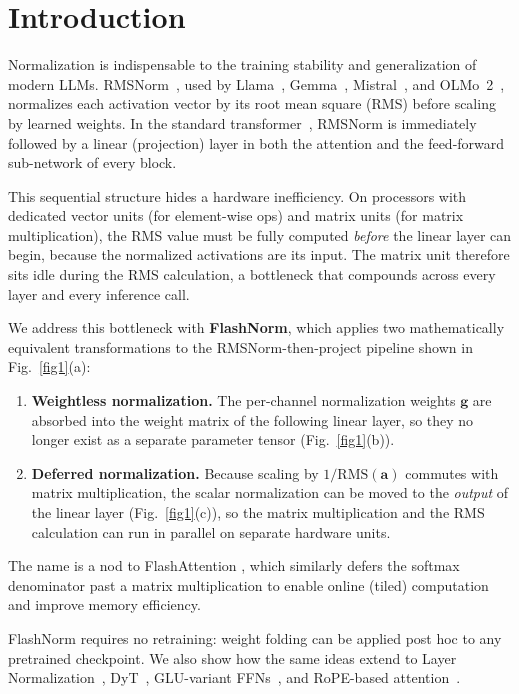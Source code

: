 \documentclass{article}
\begin{document}
\section{Introduction}
Normalization is indispensable to the training stability and generalization of
modern LLMs. RMSNorm~\citep{rms}, used by Llama~\citep{LLaMA},
Gemma~\citep{gemma}, Mistral~\citep{mistral}, and
OLMo~2~\citep{olmo2}, normalizes each activation vector by its root mean
square (RMS) before scaling by learned weights. In the standard transformer~\citep{vanilla},
RMSNorm is immediately followed by a linear (projection) layer in both the attention and the
feed-forward sub-network of every block.

This sequential structure hides a hardware inefficiency. On processors with
dedicated vector units (for element-wise ops) and matrix units (for matrix multiplication), the
RMS value must be fully computed \emph{before} the linear layer can begin, because
the normalized activations are its input. The matrix unit therefore sits idle during
the RMS calculation, a bottleneck that compounds across every layer and every inference call.

We address this bottleneck with \textbf{FlashNorm}, which applies two
mathematically equivalent transformations to the RMSNorm-then-project pipeline shown in
Fig.~\ref{fig1}(a):

\begin{enumerate}
  \item \textbf{Weightless normalization.} The per-channel normalization weights
        $\mathbf{g}$ are absorbed into the weight matrix of the following linear layer,
        so they no longer exist as a separate parameter tensor (Fig.~\ref{fig1}(b)).
  \item \textbf{Deferred normalization.} Because scaling by $1/\mathrm{RMS}(\mathbf{a})$
        commutes with matrix multiplication, the scalar normalization can be
        moved to the \emph{output} of the linear layer (Fig.~\ref{fig1}(c)), so the
        matrix multiplication and the RMS calculation can run in parallel on separate
        hardware units.
\end{enumerate}

The name is a nod to FlashAttention \citep{flash-attention}, which similarly
defers the softmax denominator past a matrix multiplication to enable
online (tiled) computation and improve memory efficiency.

FlashNorm requires no retraining: weight folding can be applied post hoc to any pretrained
checkpoint. We also show how the same ideas extend to Layer Normalization~\citep{layerNorm},
DyT~\citep{DyT}, GLU-variant FFNs~\citep{GLU}, and RoPE-based attention~\citep{RoPE}.
\end{document}
